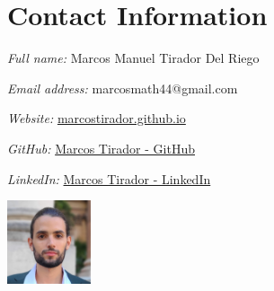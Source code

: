 \documentclass[12pt]{amsart}
\theoremstyle{definition}
\numberwithin{equation}{section}
\begin{document}
	
	
	
%	
%	
	
		

\date{\today}

	

\section{Contact Information}
\begin{minipage}[t]{0.65\textwidth} %
	\vspace{0pt} %

	\textit{Full name:} Marcos Manuel Tirador Del Riego
	
	\textit{Email address:} marcosmath44@gmail.com
	
	\textit{Website:} \href{marcostirador.github.io}{marcostirador.github.io}
	
	\textit{GitHub:} \href{https://github.com/MarcosTirador}{Marcos Tirador - GitHub}
	
	\textit{LinkedIn:} \href{https://www.linkedin.com/in/marcos-tirador-3601502b7/}{Marcos Tirador - LinkedIn}
\end{minipage}%
\hfill %
\begin{minipage}[t]{0.3\textwidth} %
	\vspace{0pt} %
	\flushright %
	\includegraphics[width=70pt]{face5.jpg} %
\end{minipage}
\end{document}
